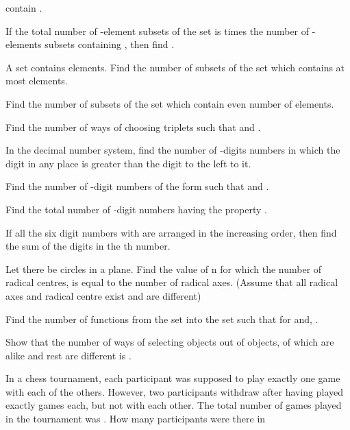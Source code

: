   contain .
\item If the total number of -element subsets of the set  is
   times the number of -elements subsets containing , then find .
\item A set contains  elements. Find the number of subsets of the set which contains at most
   elements.
\item Find the number of subsets of the set  which contain even number of
  elements.
\item Find the number of ways of choosing triplets  such that  and
  .
\item In the decimal number system, find the number of -digits numbers in which the digit in any place
  is greater than the digit to the left to it.
\item Find the number of -digit numbers of the form  such that  and .
\item Find the total number of -digit numbers  having the property
  .
\item If all the six digit numbers  with  are arranged in the increasing order, then find the sum of the digits in the th number.
\item Let there be  circles in a plane. Find the value of n for which the number of
   radical centres, is equal to the number of radical axes. (Assume that all radical axes and radical centre
   exist and are different)
\item Find the number of functions  from the set  into the set  such that  for  and, .
\item Show that the number of ways of selecting  objects out of  objects,  of which are
  alike and rest are different is .
\item In a chess tournament, each participant was supposed to play exactly one game with each of the
  others. However, two participants withdraw after having played exactly  games each, but not with each
  other. The total number of games played in the tournament was . How many participants were there in
